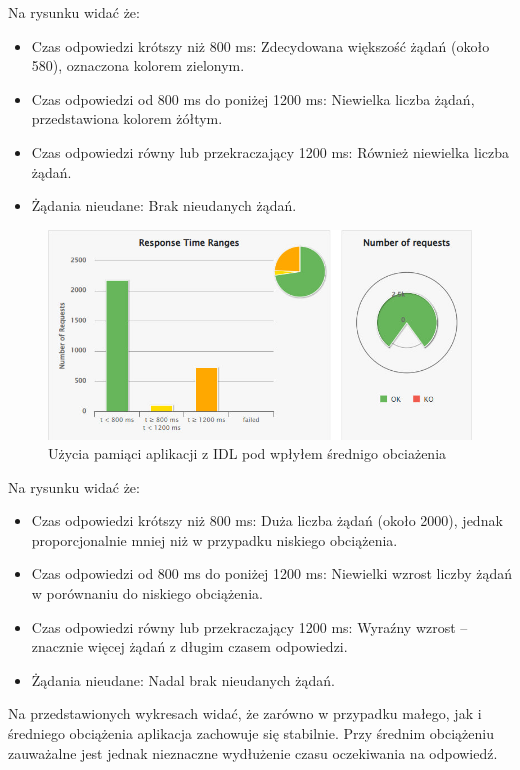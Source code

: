 \documentclass[runningheads,12pt]{llncs}
\begin{document}
Na rysunku widać że:

\begin{itemize}
    \item Czas odpowiedzi krótszy niż 800 ms: Zdecydowana większość żądań (około 580), oznaczona kolorem zielonym.
    \item Czas odpowiedzi od 800 ms do poniżej 1200 ms: Niewielka liczba żądań, przedstawiona kolorem żółtym.
    \item Czas odpowiedzi równy lub przekraczający 1200 ms: Również niewielka liczba żądań.
    \item Żądania nieudane: Brak nieudanych żądań.
  \end{itemize}

\begin{figure}
    \includegraphics[width=\linewidth]{images/idl-midle-gatling-graph.jpg}
    \caption{Użycia pamiąci aplikacji z IDL pod wpłyłem średnigo obciażenia} \label{fig1}
\end{figure}

Na rysunku widać że:

\begin{itemize}
    \item Czas odpowiedzi krótszy niż 800 ms: Duża liczba żądań (około 2000), jednak proporcjonalnie mniej niż w przypadku niskiego obciążenia.
    \item Czas odpowiedzi od 800 ms do poniżej 1200 ms: Niewielki wzrost liczby żądań w porównaniu do niskiego obciążenia.
    \item Czas odpowiedzi równy lub przekraczający 1200 ms: Wyraźny wzrost – znacznie więcej żądań z długim czasem odpowiedzi.
    \item Żądania nieudane: Nadal brak nieudanych żądań.
  \end{itemize}

Na przedstawionych wykresach widać, że zarówno w przypadku małego, jak i średniego obciążenia aplikacja zachowuje się stabilnie. Przy średnim obciążeniu zauważalne jest jednak nieznaczne wydłużenie czasu oczekiwania na odpowiedź.
\end{document}
